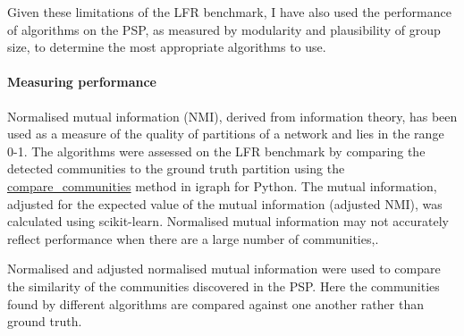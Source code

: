 Given these limitations of the LFR benchmark, I have also used the performance of algorithms on the PSP, as measured by modularity and plausibility of group size, to determine the most appropriate algorithms to use. 


\paragraph{Measuring performance}
Normalised mutual information (NMI), derived from information theory, has been used as a measure of the quality of partitions of a network\cite{danon2005comparing} and lies in the range 0-1. The algorithms were assessed on the LFR benchmark by comparing the detected communities to the ground truth partition using the \url{compare_communities} method in igraph for Python. The mutual information, adjusted for the expected value of the mutual information (adjusted NMI)\cite{vinh2010information}, was calculated using scikit-learn\cite{abraham2014machine}. Normalised mutual information may not accurately reflect performance when there are a large number of communities\cite{amelio2015normalized},\cite{fortunato2016community}.


Normalised and adjusted normalised mutual information were  used to compare the similarity of the communities discovered in the PSP. Here the communities found by different algorithms are compared against one another rather than ground truth. 











